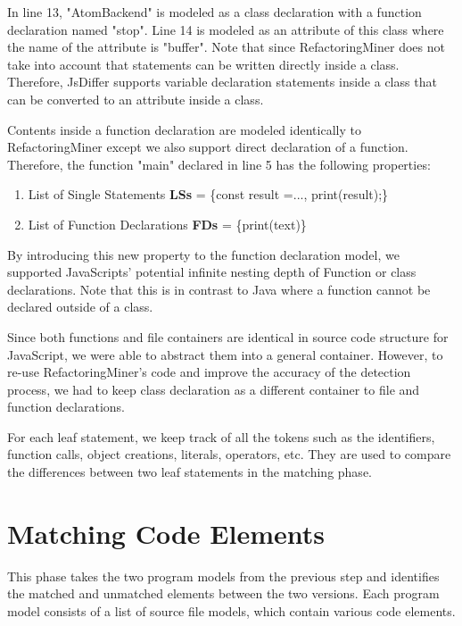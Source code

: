 \documentclass[letterpaper,12pt,onecolumn,final]{report}
\begin{document}
In line 13, "AtomBackend" is modeled as a class declaration with a function declaration named "stop". Line 14 is modeled as an attribute of this class where the name of the attribute is "buffer". Note that since RefactoringMiner does not take into account that statements can be written directly inside a class. Therefore, JsDiffer supports variable declaration statements inside a class that can be converted to an attribute inside a class.

Contents inside a function declaration are modeled identically to RefactoringMiner except we also support direct declaration of a function. Therefore, the function "main" declared in line 5 has the following properties:

\begin{enumerate}
\item List of Single Statements \textbf{LSs} = \{const result =..., print(result);\}
\item List of Function Declarations \textbf{FDs} = \{print(text)\}
\end{enumerate}


By introducing this new property to the function declaration model, we supported JavaScripts' potential infinite nesting depth of Function or class declarations. Note that this is in contrast to Java where a function cannot be declared outside of a class.

Since both functions and file containers are identical in source code structure for JavaScript, we were able to abstract them into a general container. However, to re-use RefactoringMiner's code and improve the accuracy of the detection process, we had to keep class declaration as a different container to file and function declarations.

For each leaf statement, we keep track of all the tokens such as the identifiers, function calls, object creations, literals, operators, etc. They are used to compare the differences between two leaf statements in the matching phase.

\section {Matching Code Elements}
This phase takes the two program models from the previous step and identifies the matched and unmatched elements between the two versions. Each program model consists of a list of source file models, which contain various code elements.
\end{document}
